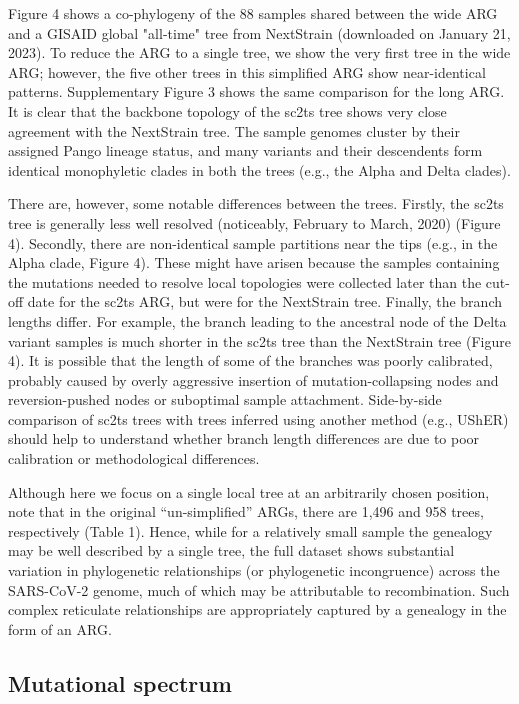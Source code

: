 \documentclass{article}
\begin{document}
Figure 4 shows a co-phylogeny of the 88 samples shared between the wide ARG and
a GISAID global "all-time" tree from NextStrain (downloaded on January 21,
2023). To reduce the ARG to a single tree, we show the very first tree in the
wide ARG; however, the five other trees in this simplified ARG show
near-identical patterns. Supplementary Figure 3 shows the same comparison for
the long ARG. It is clear that the backbone topology of the sc2ts tree shows
very close agreement with the NextStrain tree. The sample genomes cluster by
their assigned Pango lineage status, and many variants and their descendents
form identical monophyletic clades in both the trees (e.g., the Alpha and Delta
clades).

There are, however, some notable differences between the trees. Firstly, the
sc2ts tree is generally less well resolved (noticeably, February to March,
2020) (Figure 4). Secondly, there are non-identical sample partitions near the
tips (e.g., in the Alpha clade, Figure 4). These might have arisen because the
samples containing the mutations needed to resolve local topologies were
collected later than the cut-off date for the sc2ts ARG, but were for the
NextStrain tree. Finally, the branch lengths differ. For example, the branch
leading to the ancestral node of the Delta variant samples is much shorter in
the sc2ts tree than the NextStrain tree (Figure 4). It is possible that the
length of some of the branches was poorly calibrated, probably caused by overly
aggressive insertion of mutation-collapsing nodes and reversion-pushed nodes or
suboptimal sample attachment. Side-by-side comparison of sc2ts trees with trees
inferred using another method (e.g., UShER) should help to understand whether
branch length differences are due to poor calibration or methodological
differences.

Although here we focus on a single local tree at an arbitrarily chosen
position, note that in the original ``un-simplified'' ARGs, there are 1,496 and
958 trees, respectively (Table 1). Hence, while for a relatively small sample
the genealogy may be well described by a single tree, the full dataset shows
substantial variation in phylogenetic relationships (or phylogenetic
incongruence) across the SARS-CoV-2 genome, much of which may be attributable
to recombination. Such complex reticulate relationships are appropriately
captured by a genealogy in the form of an ARG.

\subsection{Mutational spectrum}
\end{document}
